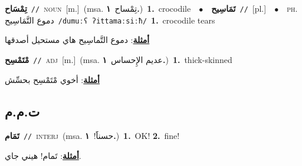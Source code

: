 \documentclass[10pt,a4paper,twoside]{article} %
\begin{document}
\begin{multicols}{2}
{\setlength\topsep{0pt}\textbf{\foreignlanguage{arabic}{تِمْسَاح}}\ {\color{gray}\texttt{//}\color{black}}\ \textsc{noun}\ [m.]\ \color{gray}(msa. \foreignlanguage{arabic}{تِمْساح}~\foreignlanguage{arabic}{\textbf{١.}})\color{black}\ \textbf{1.}~crocodile\ \ $\bullet$\ \ \setlength\topsep{0pt}\textbf{\foreignlanguage{arabic}{تَمَاسِيح}}\ {\color{gray}\texttt{//}\color{black}}\ [pl.]\ \ $\bullet$\ \ \textsc{ph.} \color{gray} \foreignlanguage{arabic}{دموع التَّمَاسِيح}\color{black}\ {\color{gray}\texttt{/{\sffamily dumuːʕ ʔittamaːsiːħ}/}\color{black}}\ \textbf{1.}~crocodile tears\  \begin{flushright}\color{gray}\foreignlanguage{arabic}{\textbf{\underline{\foreignlanguage{arabic}{أمثلة}}}: دموع التَّماسِيح هاي مستحيل أصدقها}\end{flushright}\color{black}} \vspace{2mm}

{\setlength\topsep{0pt}\textbf{\foreignlanguage{arabic}{مْتَمْسِح}}\ {\color{gray}\texttt{//}\color{black}}\ \textsc{adj}\ [m.]\ \color{gray}(msa. \foreignlanguage{arabic}{عديم الإِحساس}~\foreignlanguage{arabic}{\textbf{١.}})\color{black}\ \textbf{1.}~thick-skinned\  \begin{flushright}\color{gray}\foreignlanguage{arabic}{\textbf{\underline{\foreignlanguage{arabic}{أمثلة}}}: أخوي مْتَمْسِح بحسِّش}\end{flushright}\color{black}} \vspace{2mm}

\vspace{-3mm}
\subsection*{\color{blue}\foreignlanguage{arabic}{ت.م.م}\color{blue}{}} 

{\setlength\topsep{0pt}\textbf{\foreignlanguage{arabic}{تَمَام}}\ {\color{gray}\texttt{//}\color{black}}\ \textsc{interj}\ \color{gray}(msa. \foreignlanguage{arabic}{حسناََ!}~\foreignlanguage{arabic}{\textbf{١.}})\color{black}\ \textbf{1.}~OK!  \textbf{2.}~fine!\  \begin{flushright}\color{gray}\foreignlanguage{arabic}{\textbf{\underline{\foreignlanguage{arabic}{أمثلة}}}: تَمام! هيني جاي.}\end{flushright}\color{black}} \vspace{2mm}


\end{multicols}
\end{document}
